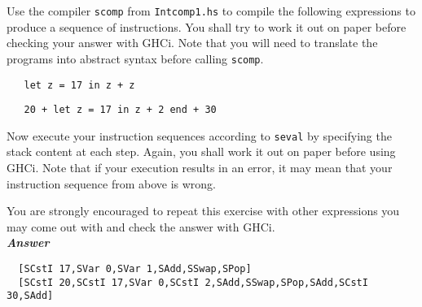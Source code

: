\documentclass[a4paper]{article}
\begin{document}
\begin{exercise} 
Use the compiler \texttt{scomp} from \texttt{Intcomp1.hs} to compile the following 
expressions to produce a sequence of instructions. You shall try to work it out on paper before checking your answer with GHCi. 
Note that you will need to translate the programs into abstract syntax before calling \texttt{scomp}. 

{\codesetup\begin{verbatim}
   let z = 17 in z + z
\end{verbatim}}

{\codesetup\begin{verbatim}
   20 + let z = 17 in z + 2 end + 30
\end{verbatim}}

Now execute your instruction sequences according to \texttt{seval} by specifying the stack content at each step. Again, you shall work 
it out on paper before using GHCi. Note that if your execution results in an error, 
it may mean that your instruction sequence from above is wrong. 

You are strongly encouraged to repeat this exercise with other expressions you may come out with and check the answer with GHCi.\\

  \noindent
\textbf{\emph{Answer}}
  {\codesetup\begin{verbatim}
  [SCstI 17,SVar 0,SVar 1,SAdd,SSwap,SPop]
  [SCstI 20,SCstI 17,SVar 0,SCstI 2,SAdd,SSwap,SPop,SAdd,SCstI 30,SAdd]
  \end{verbatim}}

\end{exercise}
\end{document}
